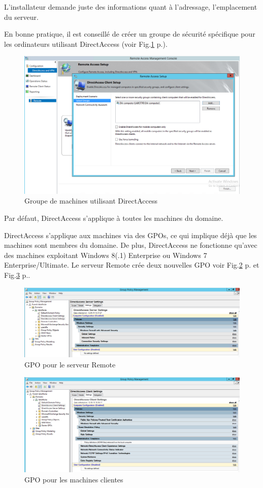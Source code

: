 L'installateur demande juste des informations quant à l'adressage, l'emplacement du serveur.

En bonne pratique, il est conseillé de créer un groupe de sécurité spécifique pour les ordinateurs utilisant DirectAccess (voir Fig.\ref{fig:gsDA} p.\pageref{fig:gsDA}).
\begin{figure}[ht]
	\centering
	\includegraphics[width=16cm]{DA/DAGroup.png}
	\caption{Groupe de machines utilisant DirectAccess}
	\label{fig:gsDA}
\end{figure}
Par défaut, DirectAccess s'applique à toutes les machines du domaine.

DirectAccess s'applique aux machines via des GPOs, ce qui implique déjà que les machines sont membres du domaine.
De plus, DirectAccess ne fonctionne qu'avec des machines exploitant Windows 8(.1) Enterprise ou Windows 7 Enterprise/Ultimate.
Le serveur Remote crée deux nouvelles GPO voir Fig.\ref{fig:srvgpoDA} p.\pageref{fig:srvgpoDA} et Fig.\ref{fig:clientgpoDA} p.\pageref{fig:clientgpoDA}.
\begin{figure}[ht]
	\centering
	\includegraphics[width=16cm]{DA/DASrvGPO.png}
	\caption{GPO pour le serveur Remote}
	\label{fig:srvgpoDA}
\end{figure} 
\begin{figure}[ht]
	\centering
	\includegraphics[width=16cm]{DA/DAClientGPO.png}
	\caption{GPO pour les machines clientes}
	\label{fig:clientgpoDA}
\end{figure} 

